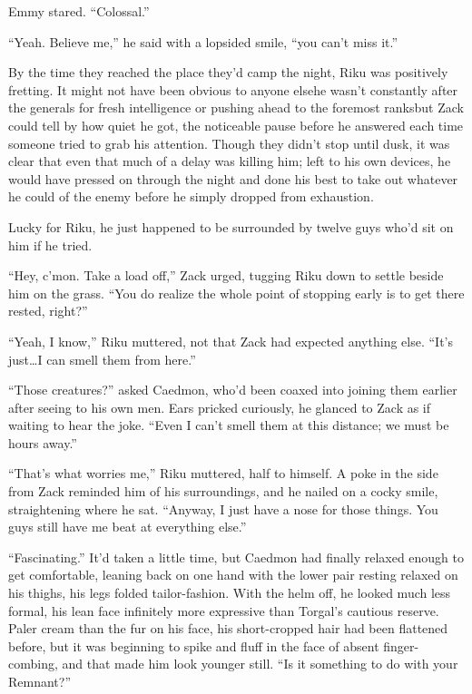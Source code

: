 Emmy stared. ``Colossal.''

``Yeah. Believe me,'' he said with a lopsided smile, ``you can't miss it.''


\scenechange


By the time they reached the place they'd camp the night, Riku was positively fretting. It might not have been obvious to anyone else\textemdash he wasn't constantly after the generals for fresh intelligence or pushing ahead to the foremost ranks\textemdash but Zack could tell by how quiet he got, the noticeable pause before he answered each time someone tried to grab his attention. Though they didn't stop until dusk, it was clear that even that much of a delay was killing him; left to his own devices, he would have pressed on through the night and done his best to take out whatever he could of the enemy before he simply dropped from exhaustion.

Lucky for Riku, he just happened to be surrounded by twelve guys who'd sit on him if he tried.

``Hey, c'mon. Take a load off,'' Zack urged, tugging Riku down to settle beside him on the grass. ``You do realize the whole point of stopping early is to get there rested, right?''

``Yeah, I know,'' Riku muttered, not that Zack had expected anything else. ``It's just\ldots I can smell them from here.''

``Those creatures?'' asked Caedmon, who'd been coaxed into joining them earlier after seeing to his own men. Ears pricked curiously, he glanced to Zack as if waiting to hear the joke. ``Even I can't smell them at this distance; we must be hours away.''

``That's what worries me,'' Riku muttered, half to himself. A poke in the side from Zack reminded him of his surroundings, and he nailed on a cocky smile, straightening where he sat. ``Anyway, I just have a nose for those things. You guys still have me beat at everything else.''

``Fascinating.'' It'd taken a little time, but Caedmon had finally relaxed enough to get comfortable, leaning back on one hand with the lower pair resting relaxed on his thighs, his legs folded tailor-fashion. With the helm off, he looked much less formal, his lean face infinitely more expressive than Torgal's cautious reserve. Paler cream than the fur on his face, his short-cropped hair had been flattened before, but it was beginning to spike and fluff in the face of absent finger-combing, and that made him look younger still. ``Is it something to do with your Remnant?''

